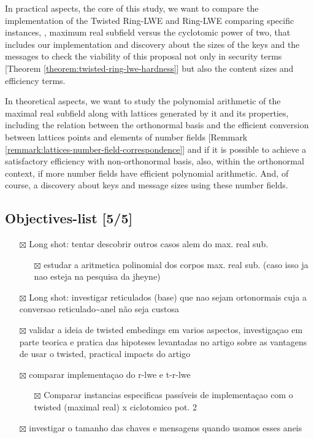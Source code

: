 \documentclass[a4paper,12pt]{article}
\begin{document}
In practical aspects, the core of this study, we want to compare the implementation of the Twisted Ring-LWE and Ring-LWE comparing specific instances, \ie, maximum real subfield versus the cyclotomic power of two, that includes our implementation and discovery about the sizes of the keys and the messages to check the viability of this proposal not only in security terms [Theorem \ref{theorem:twisted-ring-lwe-hardness}] but also the content sizes and efficiency terms.

In theoretical aspects, we want to study the polynomial arithmetic of the maximal real subfield along with lattices generated by it and its properties, including the relation between the orthonormal basis and the efficient conversion between lattices points and elements of number fields [Remmark \ref{remmark:lattices-number-field-correspondence}] and if it is possible to achieve a satisfactory efficiency with non-orthonormal basis, also, within the orthonormal context, if more number fields have efficient polynomial arithmetic. And, of course, a discovery about keys and message sizes using these number fields.
\subsection{Objectives-list [5/5]}
\label{sec:org8a0805c}
\begin{itemize}
\item[{$\boxtimes$}] Long shot: tentar descobrir outros casos alem do max. real sub.
\begin{itemize}
\item[{$\boxtimes$}] estudar a aritmetica polinomial dos corpos max. real sub. (caso isso ja nao esteja na pesquisa da jheyne)
\end{itemize}
\item[{$\boxtimes$}] Long shot: investigar reticulados (base) que nao sejam ortonormais cuja a conversao reticulado\textasciitilde{}anel não seja custosa
\item[{$\boxtimes$}] validar a ideia de twisted embedings em varios aspectos, investigaçao em parte teorica e pratica das hipoteses levantadas
no artigo sobre as vantagens de usar o twisted, practical impacts do artigo
\item[{$\boxtimes$}] comparar implementaçao do r-lwe e t-r-lwe
\begin{itemize}
\item[{$\boxtimes$}] Comparar instancias especificas passíveis de implementaçao com o twisted (maximal real) x ciclotomico pot. 2
\end{itemize}

\item[{$\boxtimes$}] investigar o tamanho das chaves e mensagens quando usamos esses aneis
\end{itemize}
\end{document}
